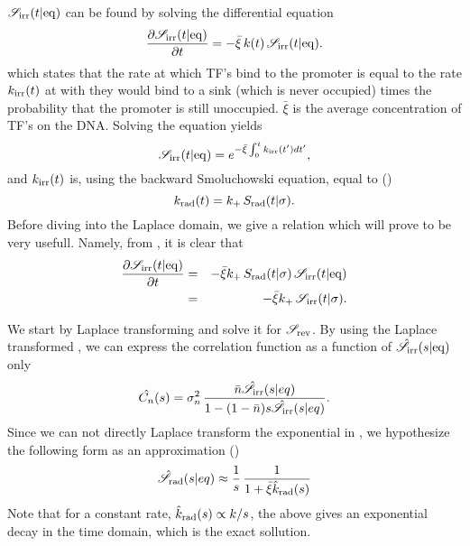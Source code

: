 $\mathscr{S}_{\rm irr}(t|{\rm eq})$ can be found by solving the differential equation
\begin{equation}
 \pdiff{\mathscr{S}_{\rm irr}(t|{\rm eq})}{t} = - \bar{\xi} \, k(t) \, \mathscr{S}_{\rm irr}(t|{\rm eq}).
 \elabel{DE_Seq}
\end{equation}
which states that the rate at which TF's bind to the promoter is equal to the rate $k_{{\rm irr}}(t)$ at with they would bind to a sink (which is never occupied) times the probability that the promoter is still unoccupied. $\bar{\xi}$ is the average concentration of TF's on the DNA. Solving the equation yields
\begin{equation}
 \mathscr{S}_{\rm irr}(t|{\rm eq}) = e^{-\bar{\xi}\int_0^t k_{{\rm irr}}(t') dt'},
 \elabel{Seq}
\end{equation}
and $k_{{\rm irr}}(t)$ is, using the backward Smoluchowski equation, equal to ()
\begin{equation}
 k_{\rm rad}(t) = k_+ \, S_{\rm rad}(t|\sigma).
 \elabel{krad}
\end{equation}
Before diving into the Laplace domain, we give a relation which will prove to be very usefull. Namely, from , it is clear that
\begin{eqnarray}
 \pdiff{\mathscr{S}_{\rm irr}(t|{\rm eq})}{t} & = & -\bar{\xi} k_+ \, S_{\rm rad}(t|\sigma) \, \mathscr{S}_{\rm irr}(t|{\rm eq}) \\
 & = & -\bar{\xi} k_+ \, \mathscr{S}_{\rm irr}(t|\sigma).
 \elabel{SeqSsi}
\end{eqnarray}

We start by Laplace transforming  and solve it for $\mathscr{S}_{\rm rev}$. By using the Laplace transformed , we can express the correlation function as a function of $\hat{\mathscr{S}}_{\rm irr}(s|{\rm eq})$ only
\begin{equation}
 \hat{C_n}(s) = \sigma_n^2 \, \frac{\bar{n} \hat{\mathscr{S}}_{\rm irr}(s|eq)}{1-(1-\bar{n})s\hat{\mathscr{S}}_{\rm irr}(s|eq)}.
 \elabel{LapCorr}
\end{equation}
Since we can not directly Laplace transform the exponential in , we hypothesize the following form as an approximation ()
\begin{equation}
 \hat{\mathscr{S}}_{\rm rad}(s|eq) \approx \frac{1}{s}  \, \frac{1}{ 1 + \bar{\xi} \hat{k}_{\rm rad}(s)}
 \elabel{Seq_approx}
\end{equation}
Note that for a constant rate, $\hat{k}_{\rm rad}(s) \propto k/s$, the above gives an exponential decay in the time domain, which is the exact sollution. 


